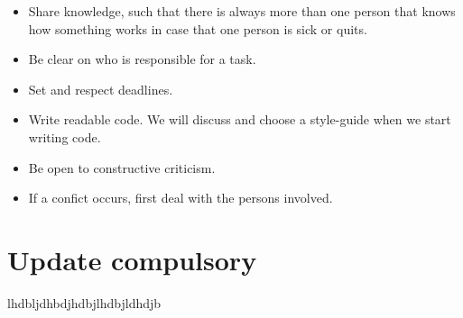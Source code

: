 \documentclass[norsk]{article}
\begin{document}
  \begin{itemize}
  	\item 
  	Share knowledge, such that there is always more than one person that knows how something works in case that one person is sick or quits.
  	\item 
  	Be clear on who is responsible for a task.
  	\item 
  	Set and respect deadlines.
  	\item 
  	Write readable code. We will discuss and choose a style-guide when we start writing code. 
  	\item 
  	Be open to constructive criticism.
  	\item
  	If a confict occurs, first deal with the persons involved. 
 \end{itemize}

\section{Update compulsory}
lhdbljdhbdjhdbjlhdbjldhdjb
	
\end{document}
